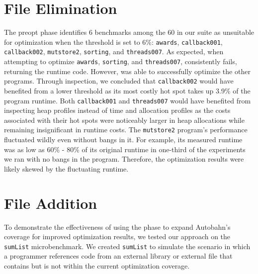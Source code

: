 
\section{\Preopt{} File Elimination}

\label{sec:file-elim}

The preopt{} phase identifies 6 benchmarks among the 60 in our suite
as unsuitable for optimization when the \hotspotcost{}
threshold is set to 6\%:  \texttt{awards}, \texttt{callback001},
\texttt{callback002}, \texttt{mutstore2}, \texttt{sorting}, and \texttt{threads007}. As
expected, when attempting to
optimize \texttt{awards}, \texttt{sorting},
and \texttt{threads007}, \Ao{} consistently fails, returning
the \unimp{} runtime code. However, \Ao{} was able to
successfully optimize the other programs. Through inspection, we
concluded that \texttt{callback002} would have benefited from a
lower \hotspotcost{} threshold as its most costly hot spot takes up
3.9\% of the program runtime. Both \texttt{callback001}
and \texttt{threads007} would have benefited from inspecting heap
profiles instead of time and allocation profiles as the costs
associated with their hot spots were noticeably larger in heap
allocations while remaining insignificant in runtime
costs. The \texttt{mutstore2} program's performance fluctuated wildly
even without bangs in it. For example, its measured runtime was as low
as 60\% - 80\% of its original runtime in one-third of the experiments
we ran with no bangs in the program. Therefore, the optimization
results were likely skewed by the fluctuating runtime.


\section{\Preopt{} File Addition}

To demonstrate the effectiveness of using the \preopt{} phase to
expand Autobahn's coverage for improved optimization results, we
tested our approach on the \texttt{sumList} microbenchmark. We
created \texttt{sumList} to simulate the scenario in which a
programmer references code from an external library or external file
that contains \hotspots{} but is not within the current optimization
coverage.

